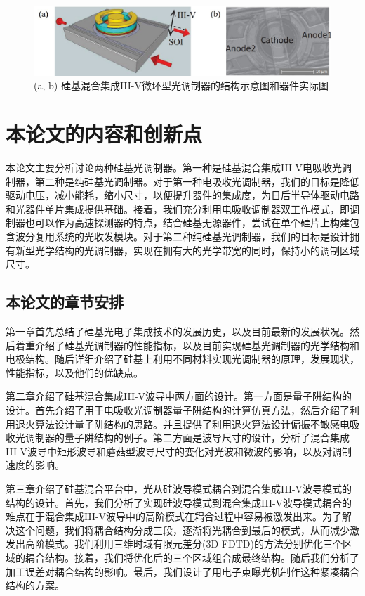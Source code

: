 \begin{figure}[htb]
	\centering
	\includegraphics[width=12cm]{./Pictures/fig_eam_ring.jpg}
	\caption{ (a, b) 硅基混合集成III-V微环型光调制器的结构示意图和器件实际图\cite{Srinivasan2012micro}}
	\label{fig_eam_ring}
\end{figure}

\section{本论文的内容和创新点}
本论文主要分析讨论两种硅基光调制器。第一种是硅基混合集成III-V电吸收光调制器，第二种是纯硅基光调制器。对于第一种电吸收光调制器，我们的目标是降低驱动电压，减小能耗，缩小尺寸，以便提升器件的集成度，为日后半导体驱动电路和光器件单片集成提供基础。接着，我们充分利用电吸收调制器双工作模式，即调制器也可以作为高速探测器的特点，结合硅基无源器件，尝试在单个硅片上构建包含波分复用系统的光收发模块。对于第二种纯硅基光调制器，我们的目标是设计拥有新型光学结构的光调制器，实现在拥有大的光学带宽的同时，保持小的调制区域尺寸。

\subsection{本论文的章节安排}
第一章首先总结了硅基光电子集成技术的发展历史，以及目前最新的发展状况。然后着重介绍了硅基光调制器的性能指标，以及目前实现硅基光调制器的光学结构和电极结构。随后详细介绍了硅基上利用不同材料实现光调制器的原理，发展现状，性能指标，以及他们的优缺点。

第二章介绍了硅基混合集成III-V波导中两方面的设计。第一方面是量子阱结构的设计。首先介绍了用于电吸收光调制器量子阱结构的计算仿真方法，然后介绍了利用退火算法设计量子阱结构的思路。并且提供了利用退火算法设计偏振不敏感电吸收光调制器的量子阱结构的例子。第二方面是波导尺寸的设计，分析了混合集成III-V波导中矩形波导和蘑菇型波导尺寸的变化对光波和微波的影响，以及对调制速度的影响。

第三章介绍了硅基混合平台中，光从硅波导模式耦合到混合集成III-V波导模式的结构的设计。首先，我们分析了实现硅波导模式到混合集成III-V波导模式耦合的难点在于混合集成III-V波导中的高阶模式在耦合过程中容易被激发出来。为了解决这个问题，我们将耦合结构分成三段，逐渐将光耦合到最后的模式，从而减少激发出高阶模式。我们利用三维时域有限元差分(3D FDTD)的方法分别优化三个区域的耦合结构。接着，我们将优化后的三个区域组合成最终结构。随后我们分析了加工误差对耦合结构的影响。最后，我们设计了用电子束曝光机制作这种紧凑耦合结构的方案。

